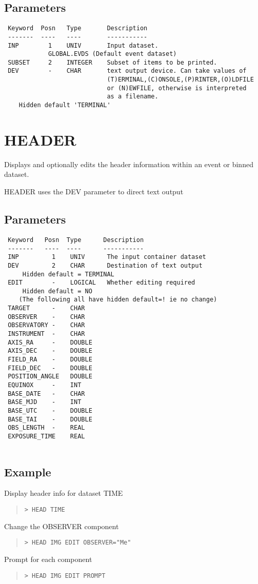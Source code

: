 \documentclass{book}
\renewcommand{\_}{{\tt\char'137}}     %
\begin{document}
\subsection{Parameters}
\begin{verbatim}
 Keyword  Posn   Type       Description
 -------  ----   ----       -----------
 INP        1    UNIV       Input dataset.
            GLOBAL.EVDS (Default event dataset)
 SUBSET     2    INTEGER    Subset of items to be printed.
 DEV        -    CHAR       text output device. Can take values of
                            (T)ERMINAL,(C)ONSOLE,(P)RINTER,(O)LDFILE
                            or (N)EWFILE, otherwise is interpreted
                            as a filename.
    Hidden default 'TERMINAL'
\end{verbatim}\section{HEADER}
Displays and optionally edits the header information within
an event or binned dataset.
 
HEADER uses the DEV parameter to direct text output
 
\subsection{Parameters}
\begin{verbatim}
 Keyword   Posn  Type      Description
 -------   ----  ----      -----------
 INP         1    UNIV      The input container dataset
 DEV         2    CHAR      Destination of text output
     Hidden default = TERMINAL
 EDIT        -    LOGICAL   Whether editing required
     Hidden default = NO
    (The following all have hidden default=! ie no change)
 TARGET      -    CHAR
 OBSERVER    -    CHAR
 OBSERVATORY -    CHAR
 INSTRUMENT  -    CHAR
 AXIS_RA     -    DOUBLE
 AXIS_DEC    -    DOUBLE
 FIELD_RA    -    DOUBLE
 FIELD_DEC   -    DOUBLE
 POSITION_ANGLE   DOUBLE
 EQUINOX     -    INT
 BASE_DATE   -    CHAR
 BASE_MJD    -    INT
 BASE_UTC    -    DOUBLE
 BASE_TAI    -    DOUBLE
 OBS_LENGTH  -    REAL
 EXPOSURE_TIME    REAL
 
\end{verbatim}\subsection{Example}
Display header info for dataset TIME
\begin{quote}\begin{verbatim}
> HEAD TIME
\end{verbatim}\end{quote}
Change the OBSERVER component
\begin{quote}\begin{verbatim}
> HEAD IMG EDIT OBSERVER="Me"
\end{verbatim}\end{quote}
Prompt for each component
\begin{quote}\begin{verbatim}
> HEAD IMG EDIT PROMPT
\end{verbatim}\end{quote}
\end{document}
